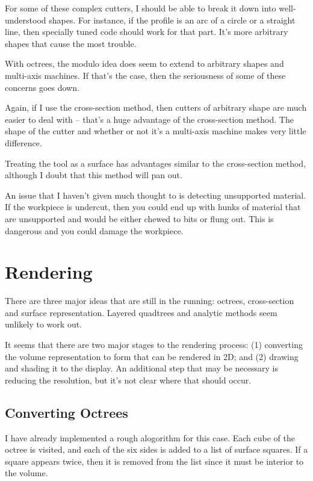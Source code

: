 \documentclass[titlepage,oneside,10pt]{article}
\begin{document}
For some of these complex cutters, I should be able to break it down
into well-understood shapes. For instance, if the profile is an arc
of a circle or a straight line, then specially tuned code should work
for that part. It's more arbitrary shapes that cause the most trouble.

With octrees, the modulo idea does seem to extend to arbitrary
shapes and multi-axis machines. If that's the case, then the
seriousness of some of these concerns goes down.

Again, if I use the cross-section method, then cutters of arbitrary
shape are much easier to deal with -- that's a huge advantage of the
cross-section method. The shape of the cutter and whether or not it's
a multi-axis machine makes very little difference.

Treating the tool as a surface has advantages similar to the
cross-section method, although I doubt that this method will pan out. 

An issue that I haven't given much thought to is detecting unsupported
material. If the workpiece is undercut, then you could end up with
hunks of material that are unsupported and would be either chewed to
bits or flung out. This is dangerous and you could damage the workpiece.

\section{Rendering}

There are three major ideas that are still in the running: octrees,
cross-section and surface representation. Layered quadtrees and
analytic methods seem unlikely to work out. 

It seems that there are two major stages to the rendering process: (1)
converting the volume representation to form that can be rendered in
2D; and (2) drawing and shading it to the display. An additional step
that may be necessary is reducing the resolution, but it's not clear
where that should occur.

\subsection{Converting Octrees}

I have already implemented a rough alogorithm for this case. Each cube
of the octree is visited, and each of the six sides is added to a list
of surface squares. If a square appears twice, then it is removed from
the list since it must be interior to the volume.
\end{document}
